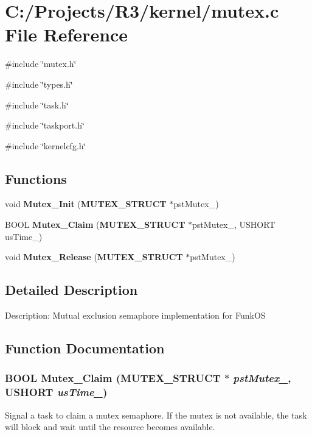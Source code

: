 \section{C:/Projects/R3/kernel/mutex.c File Reference}
\label{mutex_8c}
{\ttfamily \#include \char`\"{}mutex.h\char`\"{}}\par
{\ttfamily \#include \char`\"{}types.h\char`\"{}}\par
{\ttfamily \#include \char`\"{}task.h\char`\"{}}\par
{\ttfamily \#include \char`\"{}taskport.h\char`\"{}}\par
{\ttfamily \#include \char`\"{}kernelcfg.h\char`\"{}}\par
\subsection*{Functions}
\begin{DoxyCompactItemize}
\item 
void {\bf Mutex\_\-Init} ({\bf MUTEX\_\-STRUCT} $\ast$pstMutex\_\-)
\item 
BOOL {\bf Mutex\_\-Claim} ({\bf MUTEX\_\-STRUCT} $\ast$pstMutex\_\-, USHORT usTime\_\-)
\item 
void {\bf Mutex\_\-Release} ({\bf MUTEX\_\-STRUCT} $\ast$pstMutex\_\-)
\end{DoxyCompactItemize}


\subsection{Detailed Description}
Description: Mutual exclusion semaphore implementation for FunkOS 

\subsection{Function Documentation}
\subsubsection[{Mutex\_\-Claim}]{\setlength{\rightskip}{0pt plus 5cm}BOOL Mutex\_\-Claim ({\bf MUTEX\_\-STRUCT} $\ast$ {\em pstMutex\_\-}, \/  USHORT {\em usTime\_\-})}\label{mutex_8c_a3ceb42d00b59e5e684138917dde4084a}
Signal a task to claim a mutex semaphore. If the mutex is not available, the task will block and wait until the resource becomes available.


